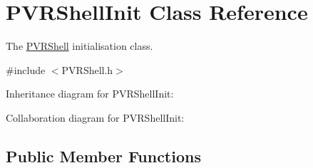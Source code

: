 \hypertarget{class_p_v_r_shell_init}{\section{P\+V\+R\+Shell\+Init Class Reference}
\label{class_p_v_r_shell_init}
}


The \hyperlink{class_p_v_r_shell}{P\+V\+R\+Shell} initialisation class.  




{\ttfamily \#include $<$P\+V\+R\+Shell.\+h$>$}



Inheritance diagram for P\+V\+R\+Shell\+Init\+:


Collaboration diagram for P\+V\+R\+Shell\+Init\+:
\subsection*{Public Member Functions}
